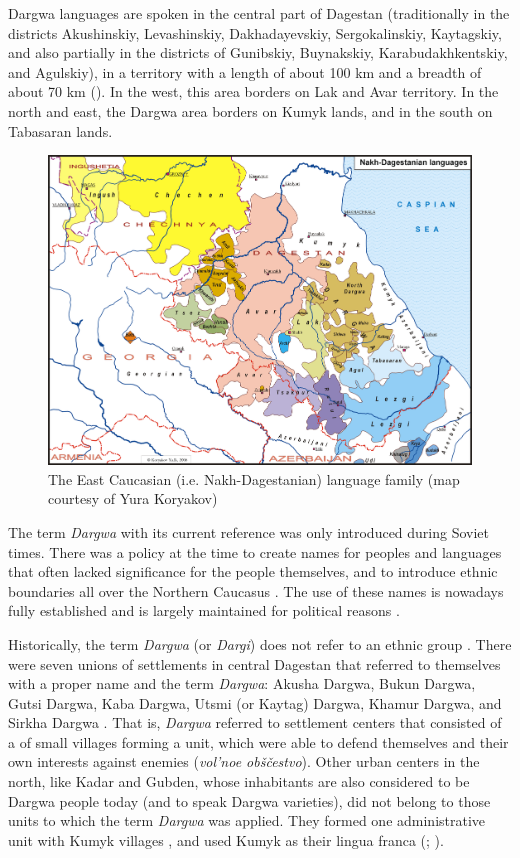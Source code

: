 Dargwa languages are spoken in the central part of Dagestan (traditionally in the districts Akushinskiy, Levashinskiy, Dakhadayevskiy, Sergokalinskiy, Kaytagskiy, and also partially in the districts of Gunibskiy, Buynakskiy, Karabudakhkentskiy, and Agulskiy), in a territory with a length of about 100 km and a breadth of about 70 km (). In the west, this area borders on Lak and Avar territory. In the north and east, the Dargwa area borders on Kumyk lands, and in the south on Tabasaran lands.


\begin{figure}[t!]
	\caption{The East Caucasian (i.e. Nakh-Dagestanian) language family (map courtesy of Yura Koryakov)}
	\label{fig:Map 3}
	\includegraphics[scale=0.6, angle =90]{figures/NEC_color_2016.png}
\end{figure}

The term \textit{Dargwa} with its current reference was only introduced during Soviet times. There was a policy at the time to create names for peoples and languages that often lacked significance for the people themselves, and to introduce ethnic boundaries all over the Northern Caucasus \citep[114]{Grenoble2003}. The use of these names is nowadays fully established and is largely maintained for political reasons \citep{Shaxbanov2009}.

Historically, the term \textit{Dargwa} (or \textit{Dargi}) does not refer to an ethnic group \citep[13]{Abdullaev1954}. There were seven unions of settlements in central Dagestan that referred to themselves with a proper name and the term \textit{Dargwa}: Akusha Dargwa, Bukun Dargwa, Gutsi Dargwa, Kaba Dargwa, Utsmi (or Kaytag) Dargwa, Khamur Dargwa, and Sirkha Dargwa \citep[13]{Magomedov1999}. That is, \textit{Dargwa} referred to settlement centers that consisted of a  of small villages forming a unit, which were able to defend themselves and their own interests against enemies (\textit{vol'noe obščestvo}). Other urban centers in the north, like Kadar and Gubden, whose inhabitants are also considered to be Dargwa people today (and to speak Dargwa varieties), did not belong to those units to which the term \textit{Dargwa} was applied. They formed one administrative unit with Kumyk villages \citep[12]{Abdullaev1954}, and used Kumyk as their lingua franca (\citealt{DobrushinaDanielKoryakov}; \citealt[58]{Wixman1980}). 

